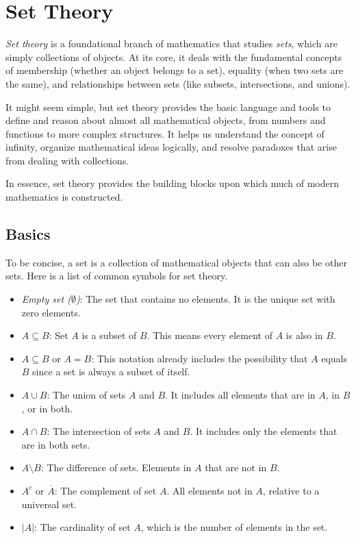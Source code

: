 \newpage
\section{Set Theory}

\emph{Set theory} is a foundational branch of mathematics that studies \emph{sets}, which are simply 
collections of objects. At its core, it deals with the fundamental concepts of membership 
(whether an object belongs to a set), equality (when two sets are the same), and relationships 
between sets (like subsets, intersections, and unions).

It might seem simple, but set theory provides the basic language and tools to define 
and reason about almost all mathematical objects, from numbers and functions to 
more complex structures. It helps us understand the concept of infinity, organize mathematical 
ideas logically, and resolve paradoxes that arise from dealing with collections.

In essence, set theory provides the building blocks upon which much of modern mathematics is constructed.

\subsection{Basics}

To be concise, a set is a collection of mathematical objects that can also be other sets.
Here is a list of common symbols for set theory.

\begin{itemize}

	\item \emph{Empty set (\(\emptyset\))}: The set that contains no elements. It is the unique set with 
	      zero elements.

	\item \(A \subseteq B\): Set \(A\) is a subset of \(B\). This means every element of 
		  \(A\) is also in \(B\).

	\item \(A \subseteq B\) or \(A = B\): This notation already includes the possibility that \(A\) 
		  equals \(B\) since a set is always a subset of itself.

	\item \(A \cup B\): The union of sets \(A\) and \(B\). It includes all elements 
	      that are in \(A\), in \(B\), or in both.

	\item \(A \cap B\): The intersection of sets \(A\) and \(B\). It includes only the elements 
	      that are in both sets.

	\item \(A \setminus B\): The difference of sets. Elements in \(A\) that are not in \(B\).

	\item \(A^c\) or \(\overline{A}\): The complement of set \(A\). All elements not in \(A\), 
		  relative to  a universal set.

	\item \(|A|\): The cardinality of set \(A\), which is the number of elements in the set.

\end{itemize}
\smallskip

